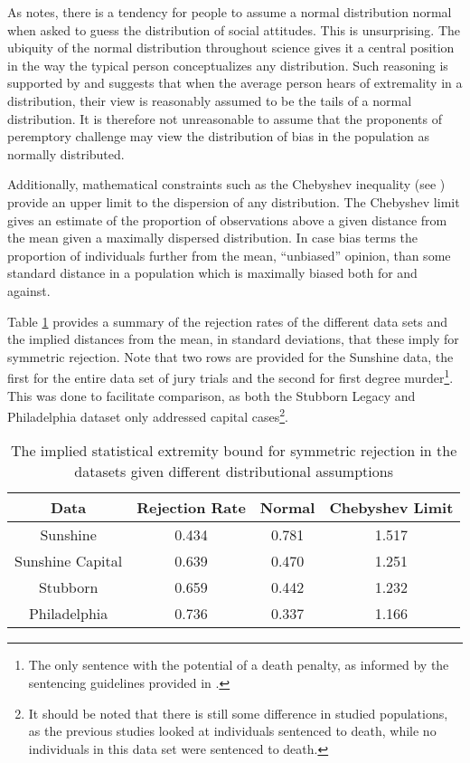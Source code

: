 As \cite{nisbett1985} notes, there is a tendency for people to assume a normal distribution normal when asked to guess the
distribution of social attitudes. This is unsurprising. The ubiquity of the normal distribution throughout science gives it a
central position in the way the typical person conceptualizes any distribution. Such reasoning is supported by \cite{nisbett1985}
and suggests that when the average person hears of extremality in a distribution, their view is reasonably assumed to be the tails
of a normal distribution. It is therefore not unreasonable to assume that the proponents of peremptory challenge may view the
distribution of bias in the population as normally distributed.

Additionally, mathematical constraints such as the Chebyshev inequality (see \cite{chebyshev}) provide an upper limit to the
dispersion of any distribution. The Chebyshev limit gives an estimate of the proportion of observations above a given distance
from the mean given a maximally dispersed distribution. In case bias terms the proportion of individuals further from the mean,
``unbiased'' opinion, than some standard distance in a population which is maximally biased both for and against.

Table \ref{tab:rejbounds} provides a summary of the rejection rates of the different data sets and the implied distances from the mean,
in standard deviations, that these imply for symmetric rejection. Note that two rows are provided for the Sunshine data, the first
for the entire data set of jury trials and the second for first degree murder\footnote{The only sentence with the potential of a
  death penalty, as informed by the sentencing guidelines   provided in \cite{offenseclass}.}. This was done to facilitate
comparison, as both the Stubborn Legacy and Philadelphia dataset only addressed capital cases\footnote{It should be noted that
  there is still some difference in studied populations, as the previous studies looked at individuals sentenced to death, while
  no individuals in this data set were sentenced to death.}.

\begin{table}[h!]
  \centering
  \caption[Implied Rejection Boundaries]{\footnotesize The implied statistical extremity bound for symmetric rejection in the datasets given
    different distributional assumptions} \label{tab:rejbounds}
  \begin{tabular}{|c|c|c|c|} \hline
    Data & Rejection Rate & Normal & Chebyshev Limit \\ \hline
    Sunshine & 0.434 & 0.781 & 1.517 \\
    Sunshine Capital & 0.639 & 0.470 & 1.251 \\
    Stubborn & 0.659 & 0.442 & 1.232 \\
    Philadelphia & 0.736 & 0.337 & 1.166 \\
    \hline
  \end{tabular}
\end{table}

